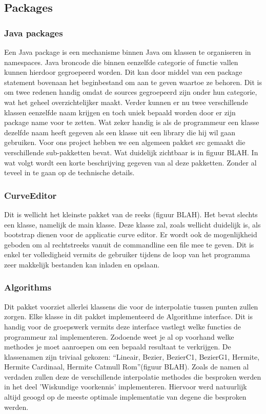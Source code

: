 \documentclass[a4paper,11pt,oneside, titlepage]{article}
\begin{document}
\subsection{Packages}
\subsubsection{Java packages}
Een Java package is een mechanisme binnen Java om klassen te organiseren in namespaces. 
Java broncode die binnen eenzelfde categorie of functie vallen kunnen hierdoor gegroepeerd 
worden. Dit kan door middel van een package statement bovenaan het beginbestand om aan te 
geven waartoe ze behoren. Dit is om twee redenen handig omdat de sources gegroepeerd zijn
onder hun categorie, wat het geheel overzichtelijker maakt. Verder kunnen er nu twee 
verschillende klassen eenzelfde naam krijgen en toch uniek bepaald worden door er zijn
package name voor te zetten. Wat zeker handig is als de programmeur een klasse dezelfde naam
heeft gegeven als een klasse uit een library die hij wil gaan gebruiken.\newline \newline
Voor ons project hebben we een algemeen pakket src gemaakt die verschillende sub-pakketten bevat.
Wat duidelijk zichtbaar is in figuur BLAH.
In wat volgt wordt een korte beschrijving gegeven van al deze pakketten. Zonder al teveel in
te gaan op de technische details. 
\subsubsection{CurveEditor}
Dit is wellicht het kleinste pakket van de reeks (figuur BLAH). Het bevat slechts een klasse, 
namelijk de 
main klasse. Deze klasse zal, zoals wellicht duidelijk is, als bootstrap dienen voor de 
applicatie curve editor. Er wordt ook de mogenlijkheid geboden om al rechtstreeks vanuit
de commandline een file mee te geven. Dit is enkel ter volledigheid vermits de gebruiker tijdens
de loop van het programma zeer makkelijk bestanden kan inladen en opslaan.
\subsubsection{Algorithms}
Dit pakket voorziet allerlei klassens die voor de interpolatie tussen punten zullen zorgen.
Elke klasse in dit pakket implementeerd de Algorithme interface. Dit is handig voor de 
groepswerk vermits deze interface vastlegt welke functies de programmeur zal implementeren.
Zodoende weet je al op voorhand welke methodes je moet aanroepen om een bepaald resultaat
te verkrijgen. \newline
De klassenamen zijn triviaal gekozen: ``Lineair, Bezier, BezierC1, BezierG1, Hermite, 
Hermite Cardinaal, Hermite Catmull Rom''(figuur BLAH). 
Zoals de namen al verdaden zullen deze de verschillende
interpolatie methodes die besproken werden in het deel 'Wiskundige voorkennis' implementeren.
Hiervoor werd natuurlijk altijd geoogd op de meeste optimale implementatie van degene die 
besproken werden.
\end{document}

